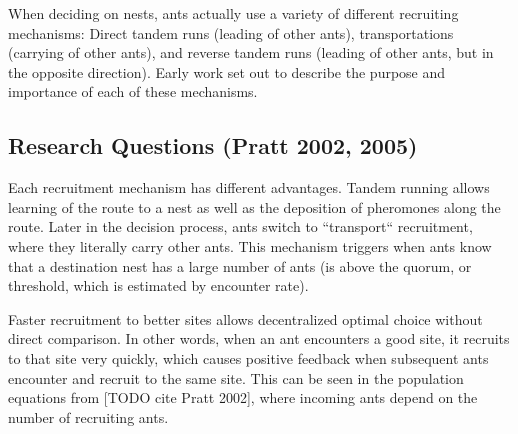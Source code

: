 \documentclass[letterpaper]{article}
\makeatletter
\def\mcolor#1#{\@mcolor{#1}}
\def\@mcolor#1#2#3{%
  \protect\leavevmode
  \begingroup
    \color#1{#2}#3%
  \endgroup
}
\newcommand{\sitem}[1]
{
    \begin{itemize}
        \item #1
    \end{itemize}
}
\makeatother
\begin{document}

When deciding on nests, ants actually use a variety of different recruiting mechanisms: Direct tandem runs (leading of other ants), transportations (carrying of other ants), and reverse tandem runs (leading of other ants, but in the opposite direction). 
Early work set out to describe the purpose and importance of each of these mechanisms.

\subsection{Research Questions (Pratt 2002, 2005)}

Each recruitment mechanism has different advantages. Tandem running allows learning of the route to a nest as well as the deposition of pheromones along the route. 
Later in the decision process, ants switch to ``transport`` recruitment, where they literally carry other ants. 
This mechanism triggers when ants know that a destination nest has a large number of ants (is above the quorum, or threshold, which is estimated by encounter rate).

Faster recruitment to better sites allows decentralized optimal choice without direct comparison.
In other words, when an ant encounters a good site, it recruits to that site very quickly, which causes positive feedback when subsequent ants encounter and recruit to the same site.
This can be seen in the population equations from [TODO cite Pratt 2002], where incoming ants depend on the number of recruiting ants.
\end{document}
